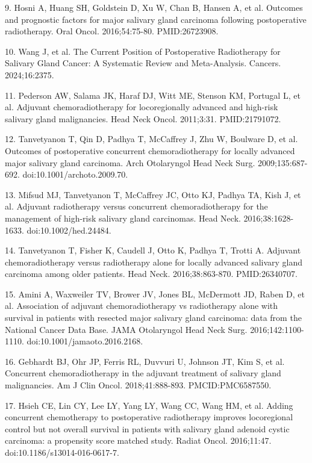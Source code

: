 \documentclass[10pt,twocolumn]{article}
\begin{document}
9. Hosni A, Huang SH, Goldstein D, Xu W, Chan B, Hansen A, et al. Outcomes and prognostic factors for major salivary gland carcinoma following postoperative radiotherapy. Oral Oncol. 2016;54:75-80. PMID:26723908.\par
10. Wang J, et al. The Current Position of Postoperative Radiotherapy for Salivary Gland Cancer: A Systematic Review and Meta-Analysis. Cancers. 2024;16:2375.\par
11. Pederson AW, Salama JK, Haraf DJ, Witt ME, Stenson KM, Portugal L, et al. Adjuvant chemoradiotherapy for locoregionally advanced and high-risk salivary gland malignancies. Head Neck Oncol. 2011;3:31. PMID:21791072.\par
12. Tanvetyanon T, Qin D, Padhya T, McCaffrey J, Zhu W, Boulware D, et al. Outcomes of postoperative concurrent chemoradiotherapy for locally advanced major salivary gland carcinoma. Arch Otolaryngol Head Neck Surg. 2009;135:687-692. doi:10.1001/archoto.2009.70.\par
13. Mifsud MJ, Tanvetyanon T, McCaffrey JC, Otto KJ, Padhya TA, Kish J, et al. Adjuvant radiotherapy versus concurrent chemoradiotherapy for the management of high-risk salivary gland carcinomas. Head Neck. 2016;38:1628-1633. doi:10.1002/hed.24484.\par
14. Tanvetyanon T, Fisher K, Caudell J, Otto K, Padhya T, Trotti A. Adjuvant chemoradiotherapy versus radiotherapy alone for locally advanced salivary gland carcinoma among older patients. Head Neck. 2016;38:863-870. PMID:26340707.\par
15. Amini A, Waxweiler TV, Brower JV, Jones BL, McDermott JD, Raben D, et al. Association of adjuvant chemoradiotherapy vs radiotherapy alone with survival in patients with resected major salivary gland carcinoma: data from the National Cancer Data Base. JAMA Otolaryngol Head Neck Surg. 2016;142:1100-1110. doi:10.1001/jamaoto.2016.2168.\par
16. Gebhardt BJ, Ohr JP, Ferris RL, Duvvuri U, Johnson JT, Kim S, et al. Concurrent chemoradiotherapy in the adjuvant treatment of salivary gland malignancies. Am J Clin Oncol. 2018;41:888-893. PMCID:PMC6587550.\par
17. Hsieh CE, Lin CY, Lee LY, Yang LY, Wang CC, Wang HM, et al. Adding concurrent chemotherapy to postoperative radiotherapy improves locoregional control but not overall survival in patients with salivary gland adenoid cystic carcinoma: a propensity score matched study. Radiat Oncol. 2016;11:47. doi:10.1186/s13014-016-0617-7.\par
\end{document}
